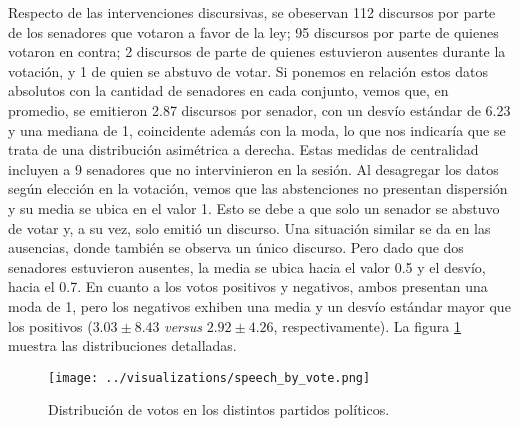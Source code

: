 Respecto de las intervenciones discursivas, se obeservan 112 discursos
por parte de los senadores que votaron a favor de la ley; 95 discursos por parte
de quienes votaron en contra; 2 discursos de parte de quienes estuvieron ausentes
durante la votación, y 1 de quien se abstuvo de votar.
Si ponemos en relación estos datos absolutos con la cantidad de senadores en cada
conjunto, vemos que, en promedio, se emitieron
2.87 discursos por senador, con un desvío estándar de 6.23 y una mediana de 1,
coincidente además
con la moda, lo que nos indicaría que se trata de una distribución asimétrica a derecha.
Estas medidas de centralidad incluyen a 9 senadores que no intervinieron en
la sesión.
Al desagregar los datos según elección en la votación, vemos que las
abstenciones no presentan
dispersión y su media se ubica en el valor 1. Esto se debe a que solo un senador
se abstuvo de votar y, a su vez, solo emitió un discurso.
Una situación similar se da en las ausencias, donde también se observa un único discurso.
Pero dado que dos senadores estuvieron ausentes, la media se ubica hacia el valor 0.5 y
el desvío, hacia el 0.7.
En cuanto a los votos positivos y negativos, ambos presentan una moda de 1,
pero los negativos
exhiben una media y un desvío estándar mayor que los positivos
($3.03\pm8.43$ \textit{versus} $2.92\pm4.26$, respectivamente).
La figura \ref{fig-distrib-speech} muestra las distribuciones detalladas.

\begin{figure}[h!]
    \centering
    \texttt{[image: ../visualizations/speech\_by\_vote.png]}
    \caption{Distribución de votos en los distintos partidos políticos.}%
    \label{fig-distrib-speech}
\end{figure}

